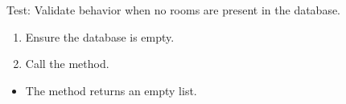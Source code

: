 \documentclass[letterpaper,10pt,english]{sphinxmanual}
\begin{document}
\begin{fulllineitems}
\label{\detokenize{test:test.test_room.test_list_rooms_empty}}
\pysigstartsignatures
\pysiglinewithargsret
{}
{}
{}
\pysigstopsignatures
\sphinxAtStartPar
Test: Validate behavior when no rooms are present in the database.
\begin{description}
\begin{enumerate}
%
\item {} 
\sphinxAtStartPar
Ensure the database is empty.

\item {} 
\sphinxAtStartPar
Call the  method.

\end{enumerate}

\begin{itemize}
\item {} 
\sphinxAtStartPar
The method returns an empty list.

\end{itemize}

\end{description}

\end{fulllineitems}

\end{document}
